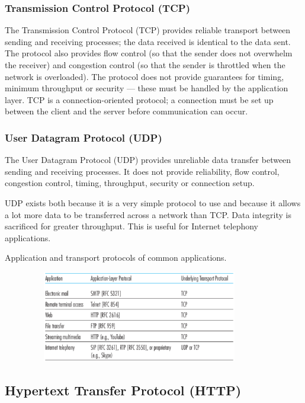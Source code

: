\subsubsection{Transmission Control Protocol (TCP)}

The Transmission Control Protocol (TCP) provides reliable transport between sending and receiving processes; the data received is identical to the data sent.
The protocol also provides flow control (so that the sender does not overwhelm the receiver) and congestion control (so that the sender is throttled when the network is overloaded).
The protocol does not provide guarantees for timing, minimum throughput or security --- these must be handled by the application layer.
TCP is a connection-oriented protocol; a connection must be set up between the client and the server before communication can occur.

\subsubsection{User Datagram Protocol (UDP)}

The User Datagram Protocol (UDP) provides unreliable data transfer between sending and receiving processes.
It does not provide reliability, flow control, congestion control, timing, throughput, security or connection setup.

UDP exists both because it is a very simple protocol to use and because it allows a lot more data to be transferred across a network than TCP\@.
Data integrity is sacrificed for greater throughput.
This is useful for Internet telephony applications.

\begin{table}[htp]
  \centering
  \caption*{Application and transport protocols of common applications.}
  \includegraphics[width=12cm,height=4cm]{unit-17/figures/transport-protocols.png}
\end{table}

\subsection{Hypertext Transfer Protocol (HTTP)}

